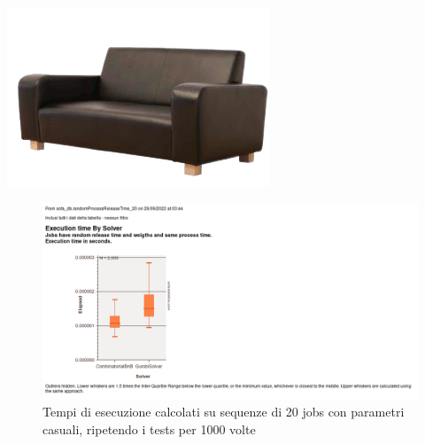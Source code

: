 \documentclass[compress]{beamer}
\begin{document}
    \begin{frame}{\subsecname \hfill \includegraphics[scale=0.1]{figs/sofastatsLogo.png}}
        \begin{figure}
            \includegraphics[scale=0.4]{../proofs/randomJobs_20_boxplot.png}
            \caption[]{Tempi di esecuzione calcolati su sequenze di 20 jobs con parametri
            casuali, ripetendo i tests per 1000 volte}
        \end{figure}        
    \end{frame}
\end{document}
